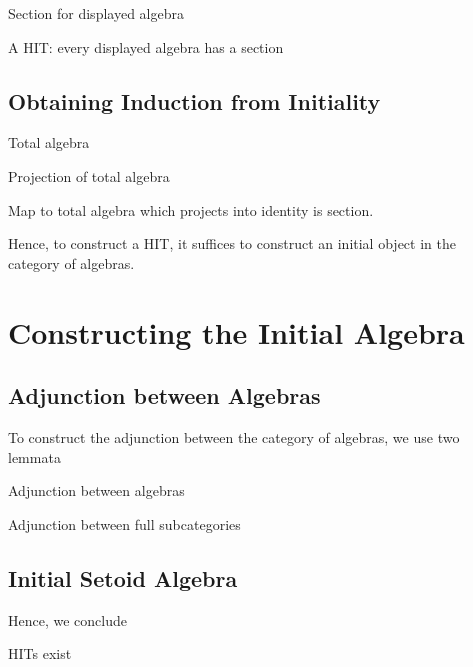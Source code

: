 \documentclass[9pt]{entcs} \usepackage{entcsmacro}
\begin{document}
\begin{definition}
Section for displayed algebra
\end{definition}

\begin{definition}
A HIT: every displayed algebra has a section
\end{definition}

\subsection{Obtaining Induction from Initiality}

\begin{definition}
Total algebra
\end{definition}

\begin{definition}
Projection of total algebra
\end{definition}

\begin{proposition}
Map to total algebra which projects into identity is section.
\end{proposition}

Hence, to construct a HIT, it suffices to construct an initial object in the category of algebras.

\section{Constructing the Initial Algebra}

\subsection{Adjunction between Algebras}
To construct the adjunction between the category of algebras, we use two lemmata

\begin{lemma}
Adjunction between algebras
\end{lemma}

\begin{lemma}
Adjunction between full subcategories
\end{lemma}

\subsection{Initial Setoid Algebra}

Hence, we conclude

\begin{theorem}
HITs exist
\end{theorem}
\end{document}

